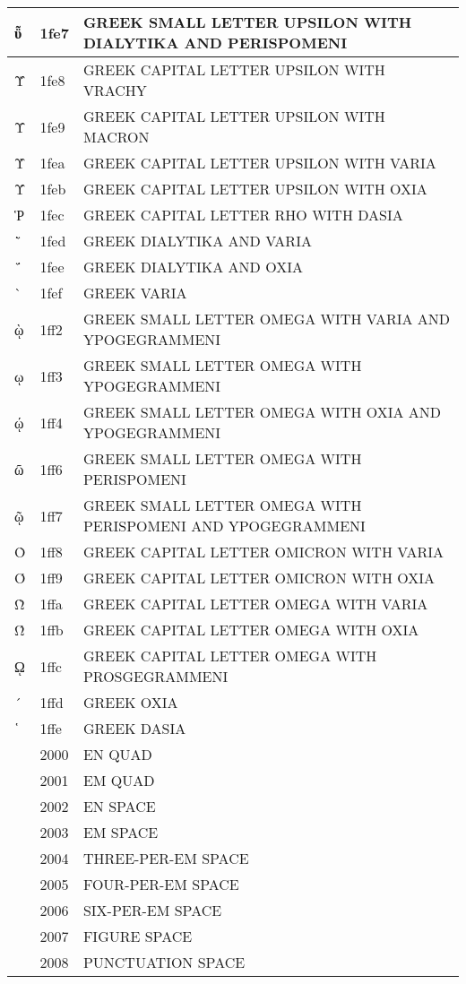 \documentclass[12pt,letterpaper,openany]{book}
\begin{document}
\begin{center}
\begin{supertabular}{|m{0.25in}|m{0.5in}|m{4in}|}
ῧ & 1fe7 & GREEK SMALL LETTER UPSILON WITH DIALYTIKA AND PERISPOMENI\\\hline
Ῠ & 1fe8 & GREEK CAPITAL LETTER UPSILON WITH VRACHY\\\hline
Ῡ & 1fe9 & GREEK CAPITAL LETTER UPSILON WITH MACRON\\\hline
Ὺ & 1fea & GREEK CAPITAL LETTER UPSILON WITH VARIA\\\hline
Ύ & 1feb & GREEK CAPITAL LETTER UPSILON WITH OXIA\\\hline
Ῥ & 1fec & GREEK CAPITAL LETTER RHO WITH DASIA\\\hline
῭ & 1fed & GREEK DIALYTIKA AND VARIA\\\hline
΅ & 1fee & GREEK DIALYTIKA AND OXIA\\\hline
` & 1fef & GREEK VARIA\\\hline
ῲ & 1ff2 & GREEK SMALL LETTER OMEGA WITH VARIA AND YPOGEGRAMMENI\\\hline
ῳ & 1ff3 & GREEK SMALL LETTER OMEGA WITH YPOGEGRAMMENI\\\hline
ῴ & 1ff4 & GREEK SMALL LETTER OMEGA WITH OXIA AND YPOGEGRAMMENI\\\hline
ῶ & 1ff6 & GREEK SMALL LETTER OMEGA WITH PERISPOMENI\\\hline
ῷ & 1ff7 & GREEK SMALL LETTER OMEGA WITH PERISPOMENI AND YPOGEGRAMMENI\\\hline
Ὸ & 1ff8 & GREEK CAPITAL LETTER OMICRON WITH VARIA\\\hline
Ό & 1ff9 & GREEK CAPITAL LETTER OMICRON WITH OXIA\\\hline
Ὼ & 1ffa & GREEK CAPITAL LETTER OMEGA WITH VARIA\\\hline
Ώ & 1ffb & GREEK CAPITAL LETTER OMEGA WITH OXIA\\\hline
ῼ & 1ffc & GREEK CAPITAL LETTER OMEGA WITH PROSGEGRAMMENI\\\hline
´ & 1ffd & GREEK OXIA\\\hline
῾ & 1ffe & GREEK DASIA\\\hline
& 2000 & EN QUAD\\\hline
& 2001 & EM QUAD\\\hline
& 2002 & EN SPACE\\\hline
& 2003 & EM SPACE\\\hline
& 2004 & THREE-PER-EM SPACE\\\hline
& 2005 & FOUR-PER-EM SPACE\\\hline
& 2006 & SIX-PER-EM SPACE\\\hline
& 2007 & FIGURE SPACE\\\hline
& 2008 & PUNCTUATION SPACE\\\hline

\end{supertabular}
\end{center}
\end{document}
